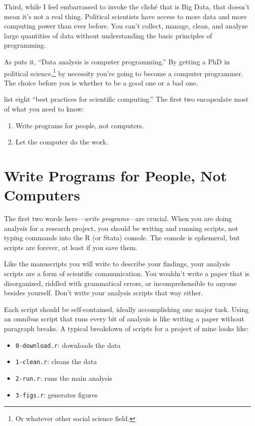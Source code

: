\documentclass[12pt,oneside,openany]{tufte-book}
\providecommand{\tightlist}{%
  \setlength{\itemsep}{0pt}\setlength{\parskip}{0pt}}
\begin{document}
Third, while I feel embarrassed to invoke the cliché that is Big Data,
that doesn't mean it's not a real thing. Political scientists have
access to more data and more computing power than ever before. You can't
collect, manage, clean, and analyze large quantities of data without
understanding the basic principles of programming.

As \citet{Bowers:2011ua} puts it, ``Data analysis is computer
programming.'' By getting a PhD in political science,\footnote{Or
  whatever other social science field.} by necessity you're going to
become a computer programmer. The choice before you is whether to be a
good one or a bad one.

\citet{Wilson:2014ck} list eight ``best practices for scientific
computing.'' The first two encapsulate most of what you need to know:

\begin{enumerate}
\def\labelenumi{\arabic{enumi}.}
\tightlist
\item
  Write programs for people, not computers.
\item
  Let the computer do the work.
\end{enumerate}

\section{Write Programs for People, Not
Computers}\label{write-programs-for-people-not-computers}

The first two words here---\emph{write programs}---are crucial. When you
are doing analysis for a research project, you should be writing and
running scripts, not typing commands into the R (or Stata) console. The
console is ephemeral, but scripts are forever, at least if you save
them.

Like the manuscripts you will write to describe your findings, your
analysis scripts are a form of scientific communication. You wouldn't
write a paper that is disorganized, riddled with grammatical errors, or
incomprehensible to anyone besides yourself. Don't write your analysis
scripts that way either.

Each script should be self-contained, ideally accomplishing one major
task. Using an omnibus script that runs every bit of analysis is like
writing a paper without paragraph breaks. A typical breakdown of scripts
for a project of mine looks like:

\begin{itemize}
\tightlist
\item
  \texttt{0-download.r}: downloads the data
\item
  \texttt{1-clean.r}: cleans the data
\item
  \texttt{2-run.r}: runs the main analysis
\item
  \texttt{3-figs.r}: generates figures
\end{itemize}
\end{document}
